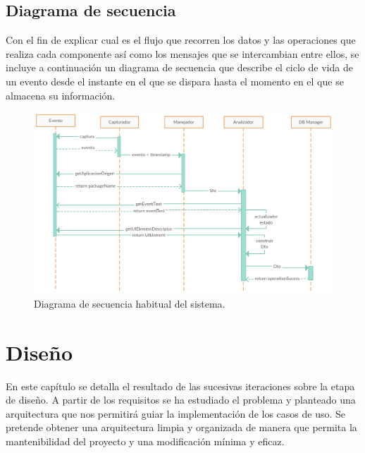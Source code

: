 \documentclass[12pt,a4paper,oneside]{book} %
\begin{document}
\section{Diagrama de secuencia}
Con el fin de explicar cual es el flujo que recorren los datos y las operaciones que realiza cada componente así como los mensajes que se intercambian entre ellos, se incluye a continuación un diagrama de secuencia que describe el ciclo de vida de un evento desde el instante en el que se dispara hasta el momento en el que se almacena su información. 
\begin{landscape}
\begin{figure}[htb]
  \begin{center}
     \includegraphics[width=1.5\textwidth]{pictures/secuencediagrams/diagrama_seq_flujo.png}
  \end{center}
  \caption[Diagrama de secuencia]{Diagrama de secuencia habitual del sistema.}
    \label{fig:LandscapeFigure}
\end{figure}
\end{landscape}


\chapter{Diseño}
En este capítulo se detalla el resultado de las sucesivas iteraciones sobre la etapa de diseño. A partir de los requisitos se ha estudiado el problema y planteado una arquitectura que nos permitirá guiar la implementación de los casos de uso. Se pretende obtener una arquitectura limpia y organizada de manera que permita la mantenibilidad del proyecto y una modificación mínima y eficaz. 
\newpage
\end{document}
